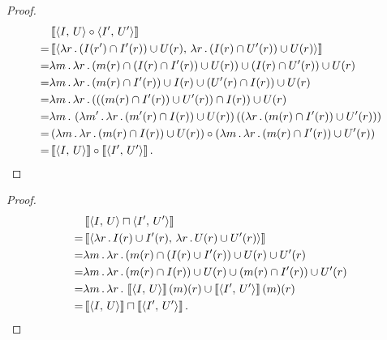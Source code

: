 \equalComp*
\begin{proof}
\begin{align*}
  &\left\llbracket\left\langle I,\,U\right\rangle\circ\left\langle I',\,U'\right\rangle\right\rrbracket\\
  =&\left\llbracket\left\langle \lambda r\,.\,(I(r')\cap I'(r))\cup U(r),\,\lambda r\,.\,(I(r)\cap U'(r))\cup U(r)\right\rangle\right\rrbracket\\
  =&\lambda m\,.\,\lambda r\,.\,(m(r)\cap(I(r)\cap I'(r))\cup U(r))\cup(I(r)\cap U'(r))\cup U(r)\\
  =&\lambda m\,.\,\lambda r\,.\,(m(r)\cap I'(r))\cup I(r)\cup (U'(r)\cap I(r))\cup U(r)\\
  =&\lambda m\,.\,\lambda r\,.\,(((m(r)\cap I'(r))\cup U'(r))\cap I(r))\cup U(r)\\
  =&\lambda m\,.\,\left(\lambda m'\,.\,\lambda r\,.\,(m'(r)\cap I(r))\cup U(r)\right)
    \left(
    \left(\lambda r\,.\,(m(r)\cap I'(r))\cup U'(r)\right)
    \right)\\
  =&\left(\lambda m\,.\,\lambda r\,.\,(m(r)\cap I(r))\cup U(r)\right)\circ
    \left(\lambda m\,.\,\lambda r\,.\,(m(r)\cap I'(r))\cup U'(r)\right)\\
  =&\left\llbracket\left\langle I,\,U\right\rangle\right\rrbracket\circ\left\llbracket\left\langle I',\,U'\right\rangle\right\rrbracket.\qedhere
\end{align*}
\end{proof}

\equalMeet*
\begin{proof}
\begin{align*}
  &\left\llbracket\left\langle I,\,U\right\rangle \sqcap \left\langle I',\,U'\right\rangle\right\rrbracket\\
  =&\left\llbracket\left\langle \lambda r\,.\,I(r) \cup I'(r),\,\lambda r\,.\,U(r) \cup U'(r)\right\rangle\right\rrbracket\\
  =&\lambda m\,.\,\lambda r\,.\,(m(r)\cap(I(r)\cup I'(r))\cup U(r)\cup U'(r)\\
  =&\lambda m\,.\,\lambda r\,.\,(m(r)\cap I(r))\cup U(r)\cup(m(r)\cap I'(r))\cup U'(r)\\
  =&\lambda m\,.\,\lambda r\,.\,\left\llbracket\left\langle I,\,U\right\rangle\right\rrbracket(m)(r)\cup\left\llbracket\left\langle I',\,U'\right\rangle\right\rrbracket(m)(r)\\
  =&\left\llbracket\left\langle I,\,U\right\rangle\right\rrbracket \sqcap \left\llbracket\left\langle I',\,U'\right\rangle\right\rrbracket.\qedhere
\end{align*}
\end{proof}

